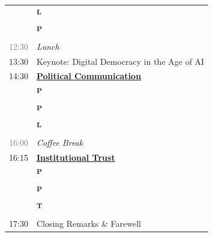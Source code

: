 \documentclass[
]{article}
\newcommand{\typeicon}[1]{%
  \textsuperscript{\sffamily\bfseries #1}%
}
\begin{document}
\begin{tabularx}{\textwidth}{lX}
 & \hspace{1.2em}\typeicon{L}\hspace{0.3em}{\small Jane Williams -- \hyperlink{jane-williams-network-detection-of-resource-allocation-patterns}{Network Detection of Resource Allocation Patterns}}\\
 & \hspace{1.2em}\typeicon{P}\hspace{0.3em}{\small John Brown -- \hyperlink{john-brown-automated-event-coding-using-generative-text-sources}{Automated Event Coding Using Generative Text Sources}}\\
\textcolor{gray}{\textsf{12:30}} & \textit{Lunch}\\
\textsf{13:30} & Keynote: Digital Democracy in the Age of AI\\
\textsf{14:30} & \textbf{\hyperlink{political-communication}{Political Communication}}\\
 & \hspace{1.2em}\typeicon{P}\hspace{0.3em}{\small Jane Miller -- \hyperlink{jane-miller-visual-framing-strategies-of-political-actors-online}{Visual Framing Strategies of Political Actors Online}}\\
 & \hspace{1.2em}\typeicon{P}\hspace{0.3em}{\small John Davis -- \hyperlink{john-davis-experimental-evidence-on-resilience-to-atmospheric-misinformation}{Experimental Evidence on Resilience to Atmospheric Misinformation}}\\
 & \hspace{1.2em}\typeicon{L}\hspace{0.3em}{\small Jane Wilson -- \hyperlink{jane-wilson-audio-media-consumption-and-factual-knowledge-acquisition}{Audio Media Consumption and Factual Knowledge Acquisition}}\\
\textcolor{gray}{\textsf{16:00}} & \textit{Coffee Break}\\
\textsf{16:15} & \textbf{\hyperlink{institutional-trust}{Institutional Trust}}\\
 & \hspace{1.2em}\typeicon{P}\hspace{0.3em}{\small John Taylor -- \hyperlink{john-taylor-quality-perceptions-and-trust-in-automated-service-provision}{Quality Perceptions and Trust in Automated Service Provision}}\\
 & \hspace{1.2em}\typeicon{P}\hspace{0.3em}{\small Jane Anderson -- \hyperlink{jane-anderson-public-acceptance-of-stochastic-decision-making-in-governance}{Public Acceptance of Stochastic Decision-Making in Governance}}\\
 & \hspace{1.2em}\typeicon{T}\hspace{0.3em}{\small John Thomas -- \hyperlink{john-thomas-mediating-mechanisms-between-external-conditions-and-evaluative-satisfaction}{Mediating Mechanisms Between External Conditions and Evaluative Satisfaction}}\\
\textsf{17:30} & Closing Remarks \& Farewell\\


\end{tabularx}
\end{document}
